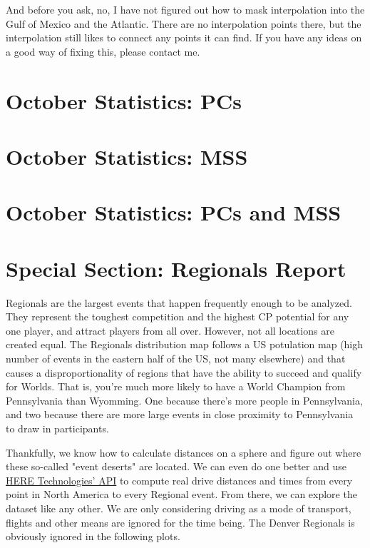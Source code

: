 \documentclass[11pt,twocolumn]{article}
\begin{document}
And before you ask, no, I have not figured out how to mask interpolation into the Gulf of Mexico and the Atlantic. There are no interpolation points there, but the interpolation still likes to connect any points it can find. If you have any ideas on a good way of fixing this, please contact me.

\section*{October Statistics: PCs}

\section*{October Statistics: MSS}

\section*{October Statistics: PCs and MSS}

\section*{Special Section: Regionals Report}

Regionals are the largest events that happen frequently enough to be analyzed. They represent the toughest competition and the highest CP potential for any one player, and attract players from all over. However, not all locations are created equal. The Regionals distribution map follows a US potulation map (high number of events in the eastern half of the US, not many elsewhere) and that causes a disproportionality of regions that have the ability to succeed and qualify for Worlds. That is, you're much more likely to have a World Champion from Pennsylvania than Wyomming. One because there's more people in Pennsylvania, and two because there are more large events in close proximity to Pennsylvania to draw in participants.

Thankfully, we know how to calculate distances on a sphere and figure out where these so-called "event deserts" are located. We can even do one better and use \href{https://developer.here.com/}{HERE Technologies' API} to compute real drive distances and times from every point in North America to every Regional event. From there, we can explore the dataset like any other. We are only considering driving as a mode of transport, flights and other means are ignored for the time being. The Denver Regionals is obviously ignored in the following plots.
\end{document}
